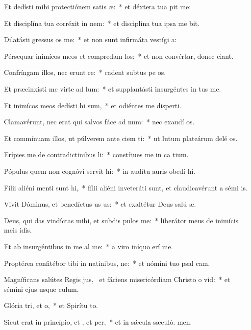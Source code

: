 \item Et dedísti mihi protectiónem satis æ:~* et déxtera tua pit me:
\item Et disciplína tua corréxit  in nem:~* et disciplína tua ipsa me bit.
\item Dilatásti gressus os  me:~* et non sunt infirmáta vestígi a:
\item Pérsequar inimícos meos et compredam los:~* et non convértar, donec ciant.
\item Confríngam illos, nec erunt re:~* cadent subtus pe os.
\item Et præcinxísti me virte ad lum:~* et supplantásti insurgéntes in  tus me.
\item Et inimícos meos dedísti hi sum,~* et odiéntes me disperti.
\item Clamavérunt, nec erat qui salvos fáce ad num:~* nec exaudí os.
\item Et commínuam illos, ut púlverem ante ciem ti:~* ut lutum plateárum delé os.
\item Erípies me de contradictinibus li:~* constítues me in ca tium.
\item Pópulus quem non cognóvi servit hi:~* in audítu auris obedí hi.
\item Fílii aliéni menti sunt hi,~* fílii aliéni inveteráti sunt, et claudicavérunt a sémi is.
\item Vivit Dóminus, et benedíctus us us:~* et exaltétur Deus salú æ.
\item Deus, qui das vindíctas mihi, et subdis pulos  me:~* liberátor meus de inimícis meis idis.
\item Et ab insurgéntibus in me al me:~* a viro iníquo erí me.
\item Proptérea confitébor tibi in natinibus, ne:~* et nómini tuo psal cam.
\item Magníficans salútes Regis jus,~\pscross{} et fáciens misericórdiam Christo o vid:~* et sémini ejus usque  culum.
\item Glória tri, et o,~* et Spirítu to.
\item Sicut erat in princípio, et , et per,~* et in sǽcula sæculó. men.
